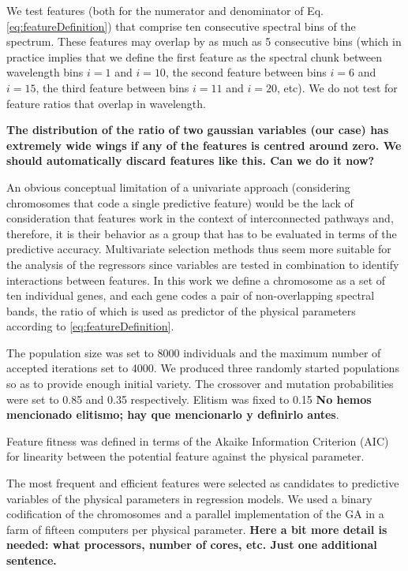 We test features (both for the numerator and denominator of
Eq. \ref{eq:featureDefinition}) that comprise ten consecutive spectral
bins of the spectrum. These features may overlap by as much as 5
consecutive bins (which in practice implies that we define the first
feature as the spectral chunk between wavelength bins $i=1$ and
$i=10$, the second feature between bins $i=6$ and $i=15$, the third
feature between bins $i=11$ and $i=20$, etc). We do not test for
feature ratios that overlap in wavelength.

{\bf The distribution of the ratio of two gaussian variables (our
case) has extremely wide wings if any of the features is centred
around zero. We should automatically discard features like this. Can
we do it now?}

An obvious conceptual limitation of a univariate approach (considering
chromosomes that code a single predictive feature) would be the lack
of consideration that features work in the context of interconnected
pathways and, therefore, it is their behavior as a group that has to
be evaluated in terms of the predictive accuracy. Multivariate
selection methods thus seem more suitable for the analysis of the
regressors since variables are tested in combination to identify
interactions between features. In this work we define a chromosome as
a set of ten individual genes, and each gene codes a pair of
non-overlapping spectral bands, the ratio of which is used as
predictor of the physical parameters according
to \ref{eq:featureDefinition}. 

The population size was set to 8000 individuals and the maximum number
of accepted iterations set to 4000. We produced three randomly started
populations so as to provide enough initial variety. The crossover and
mutation probabilities were set to 0.85 and 0.35 respectively. Elitism
was fixed to 0.15 {\bf No hemos mencionado elitismo; hay que
mencionarlo y definirlo antes}.

Feature fitness was defined in terms of the Akaike Information
Criterion (AIC) for linearity between the potential feature against
the physical parameter.

The most frequent and efficient features were selected as candidates
to predictive variables of the physical parameters in regression
models. We used a binary codification of the chromosomes and a
parallel implementation of the GA in a farm of fifteen computers per
physical parameter. {\bf Here a bit more detail is needed: what
processors, number of cores, etc. Just one additional sentence.}


